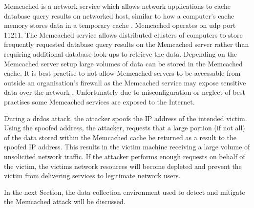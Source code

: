 Memcached is a network service which allows network
applications to cache database query results on networked
host, similar to how a computer's cache memory stores data in a temporary cache
 \cite{fitzpatrick2004distributed}. Memcached operates on \gls{udp} port 11211. The Memcached service allows distributed clusters of computers to store frequently requested database query results on the Memcached server rather than requiring additional database look-ups to retrieve the data. Depending on the Memcached server setup large volumes of data can be stored in the Memcached cache. It is best practise to not allow Memcached servers to be accessable from outside an organisation's firewall as the Memcached service may expose sensitive data over the network  \cite{ranabahu2009best}. Unfortunately due to misconfiguration or neglect of best practises some Memcached services are exposed to the Internet.  

During a \gls{drdos} attack, the attacker spoofs the IP address of the intended victim. Using the spoofed address, the attacker, requests that a large portion (if not all) of the data stored within the Memcached cache be returned as a result to the spoofed IP address. This results in the victim machine receiving a large volume of unsolicited network traffic.  If the attacker performs enough requests on behalf of the victim, the victims network resources will become depleted and prevent the victim from delivering services to legitimate network users. 

In the next Section, the data collection environment used to detect and mitigate the Memcached attack will be discussed.



 
